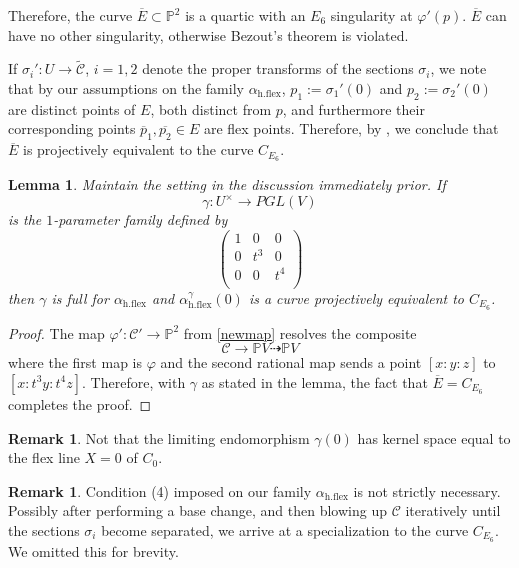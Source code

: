 \documentclass[12 pt, reqno]{amsart}
\newtheorem{lem}[thm]{Lemma}
\theoremstyle{definition}
\newtheorem{rmk}[thm]{Remark}
\newcommand{\on}{\operatorname}
\newcommand{\mb}{\mathbb}
\renewcommand{\P}{\mb{P}}
\begin{document}
Therefore, the curve $\overline{E} \subset \P^{2}$ is a quartic with
an $E_{6}$ singularity at $\varphi'(p)$.  $\overline{E}$ can have no
other singularity, otherwise Bezout's theorem is violated.

If $\sigma_{i}': U \to \widetilde{\mathcal{C}}$, $i=1,2$ denote the
proper transforms of the sections $\sigma_{i}$, we note that by our
assumptions on the family $\alpha_{\on{h.flex}}$,
$p_{1} := \sigma_{1}'(0)$ and $p_{2} := \sigma_{2}'(0)$ are distinct
points of $E$, both distinct from $p$, and furthermore their
corresponding points $\overline{p}_{1}, \overline{p_{2}} \in E$ are
flex points. Therefore, by , we conclude that $\overline{E}$
is projectively equivalent to the curve $C_{E_{6}}$.

\begin{lem}
  \label{lem:E6}
  Maintain the setting in the discussion immediately prior.  If
  \[\gamma: U^{\times} \to PGL(V)\] is the $1$-parameter family
  defined by
  \[\begin{pmatrix} 1 & 0 & 0 \\
      0 & t^3 & 0\\
      0 & 0 & t^4\\
    \end{pmatrix}\] then $\gamma$ is full for $\alpha_{\on{h.flex}}$
  and $\alpha_{\on{h.flex}}^{\gamma}(0)$ is a curve projectively
  equivalent to $C_{E_{6}}$.
\end{lem}

\begin{proof}
  The map $\varphi': \mathcal{C}' \to \P^{2}$ from \eqref{newmap}
  resolves the composite
  \[\mathcal{C} \to \P V \dashrightarrow \P V\] where the first map is
  $\varphi$ and the second rational map sends a point $[x:y:z]$ to
  $[x:t^3y:t^4z]$.  Therefore, with $\gamma$ as stated in the lemma,
  the fact that $\overline{E} = C_{E_{6}}$ completes the proof.
\end{proof}

\begin{rmk}
  \label{rmk:E6} Not that the limiting endomorphism $\gamma(0)$ has
  kernel space equal to the flex line $X=0$ of $C_0$.
\end{rmk}

\begin{rmk}
  \label{rmk:generalE6}
  Condition (4) imposed on our family $\alpha_{\on{h.flex}}$ is not
  strictly necessary.  Possibly after performing a base change, and
  then blowing up $\mathcal{C}$ iteratively until the sections
  $\sigma_{i}$ become separated, we arrive at a specialization to the
  curve $C_{E_{6}}$.  We omitted this for brevity.
\end{rmk}
\end{document}

